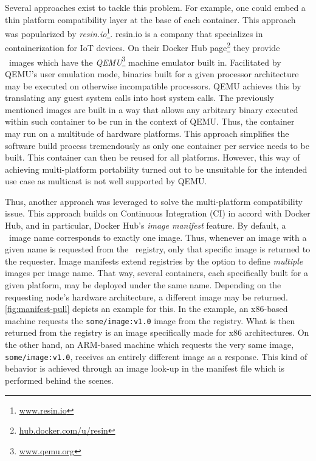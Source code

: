 Several approaches exist to tackle this problem. For example, one could embed a thin platform compatibility layer at the base of each container. This approach was popularized by \emph{resin.io}\footnote{\url{www.resin.io}}. resin.io is a company that specializes in containerization for IoT devices. On their Docker Hub page\footnote{\url{hub.docker.com/u/resin}} they provide \docker\ images which have the \emph{QEMU}\footnote{\url{www.qemu.org}} machine emulator built in. Facilitated by QEMU's user emulation mode, binaries built for a given processor architecture may be executed on otherwise incompatible processors. QEMU achieves this by translating any guest system calls into host system calls. The previously mentioned images are built in a way that allows any arbitrary binary executed within such container to be run in the context of QEMU. Thus, the container may run on a multitude of hardware platforms.
This approach simplifies the software build process tremendously as only one container per service needs to be built. This container can then be reused for all platforms. However, this way of achieving multi-platform portability turned out to be unsuitable for the intended use case as multicast is not well supported by QEMU. 

Thus, another approach was leveraged to solve the multi-platform compatibility issue. This approach builds on Continuous Integration (CI) in accord with Docker Hub, and in particular, Docker Hub's \emph{image manifest} feature. By default, a \docker\ image name corresponds to exactly one image. Thus, whenever an image with a given name is requested from the \docker\ registry, only that specific image is returned to the requester. Image manifests extend registries by the option to define \emph{multiple} images per image name. That way, several containers, each specifically built for a given platform, may be deployed under the same name. Depending on the requesting node's hardware architecture, a different image may be returned. \autoref{fig:manifest-pull} depicts an example for this. In the example, an x86-based machine requests the \texttt{some/image:v1.0} image from the registry. What is then returned from the registry is an image specifically made for x86 architectures. On the other hand, an ARM-based machine which requests the very same image, \texttt{some/image:v1.0}, receives an entirely different image as a response. This kind of behavior is achieved through an image look-up in the manifest file which is performed behind the scenes. 


